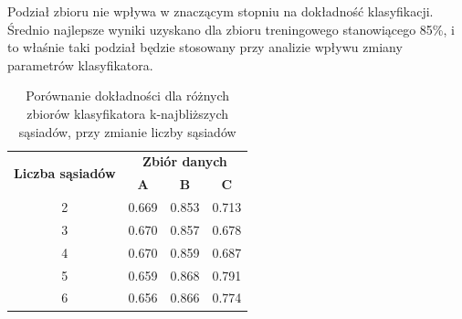 \documentclass[a4paper,11pt]{article}
\begin{document}
Podział zbioru nie wpływa w znaczącym stopniu na dokładność klasyfikacji. Średnio najlepsze wyniki uzyskano dla zbioru treningowego stanowiącego 85\%, i to właśnie taki podział będzie stosowany przy analizie wpływu zmiany parametrów klasyfikatora. 

\begin{table}[H]
    \centering
    \begin{tabular}{|c|c|c|c|}
    \hline
    \multirow{2}{*}{\textbf{Liczba sąsiadów}} & \multicolumn{3}{c|}{\textbf{Zbiór danych}} \\ \cline{2-4} 
     & \textbf{A} & \textbf{B} & \textbf{C} \\ \hline
    2 & 0.669 & 0.853 & 0.713 \\ \hline
    3 & 0.670 & 0.857 & 0.678 \\ \hline
    4 & 0.670 & 0.859 & 0.687 \\ \hline
    5 & 0.659 & 0.868 & 0.791 \\ \hline
    6 & 0.656 & 0.866 & 0.774 \\ \hline
    \end{tabular}
    \caption{Porównanie dokładności dla różnych zbiorów klasyfikatora k-najbliższych sąsiadów, przy zmianie liczby sąsiadów}
    \label{tab:cls4tab2}
\end{table}
\end{document}
